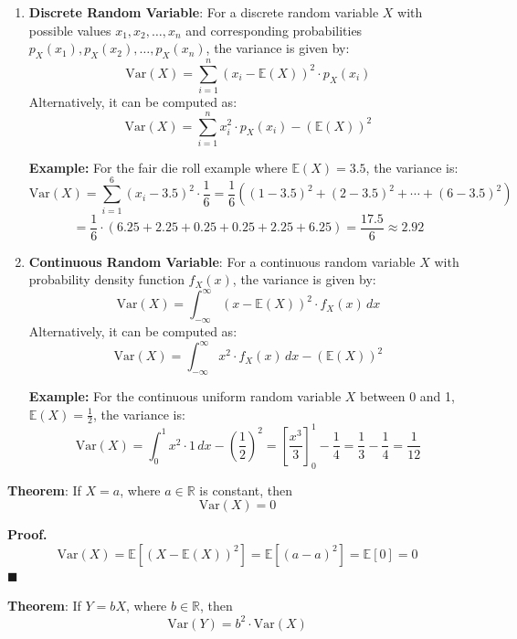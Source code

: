 \documentclass[twoside]{book}
\begin{document}
\begin{enumerate}

\item \textbf{Discrete Random Variable}: For a discrete random variable \( X \) with possible values \( x_1, x_2, \dots, x_n \) and corresponding probabilities \( p_X(x_1), p_X(x_2), \dots, p_X(x_n) \), the variance is given by:
\[
\text{Var}(X) = \sum_{i=1}^{n} (x_i - \mathbb{E}(X))^2 \cdot p_X(x_i)
\]
Alternatively, it can be computed as:
\[
\text{Var}(X) = \sum_{i=1}^{n} x_i^2 \cdot p_X(x_i) - (\mathbb{E}(X))^2
\]

\textbf{Example:} For the fair die roll example where \( \mathbb{E}(X) = 3.5 \), the variance is:
\[
\text{Var}(X) = \sum_{i=1}^{6} (x_i - 3.5)^2 \cdot \frac{1}{6} = \frac{1}{6} \left( (1-3.5)^2 + (2-3.5)^2 + \cdots + (6-3.5)^2 \right)
\]
\[
= \frac{1}{6} \cdot (6.25 + 2.25 + 0.25 + 0.25 + 2.25 + 6.25) = \frac{17.5}{6} \approx 2.92
\]

\item \textbf{Continuous Random Variable}: For a continuous random variable \( X \) with probability density function \( f_X(x) \), the variance is given by:
\[
\text{Var}(X) = \int_{-\infty}^{\infty} (x - \mathbb{E}(X))^2 \cdot f_X(x) \, dx
\]
Alternatively, it can be computed as:
\[
\text{Var}(X) = \int_{-\infty}^{\infty} x^2 \cdot f_X(x) \, dx - (\mathbb{E}(X))^2
\]

\textbf{Example:} For the continuous uniform random variable \( X \) between 0 and 1, $\mathbb{E}(X) = \frac{1}{2}$, the variance is:
\[
\text{Var}(X) = \int_0^1 x^2 \cdot 1 \, dx - \left(\frac{1}{2}\right)^2 = \left[ \frac{x^3}{3} \right]_0^1 - \frac{1}{4} = \frac{1}{3} - \frac{1}{4} = \frac{1}{12}
\]
\end{enumerate}

\begin{textbox}
\textbf{Theorem}: If \( X = a \), where \( a \in \mathbb{R} \) is constant, then  
\[
\mathrm{Var}(X) = 0
\]
\end{textbox}

\textbf{Proof.}  
\[
\mathrm{Var}(X) = \mathbb{E}[(X - \mathbb{E}(X))^2] = \mathbb{E}[(a - a)^2] = \mathbb{E}[0] = 0
\]
\hfill\(\blacksquare\)

\vspace{1em}

\begin{textbox}
\textbf{Theorem}: If \( Y = bX \), where \( b \in \mathbb{R} \), then  
\[
\mathrm{Var}(Y) = b^2 \cdot \mathrm{Var}(X)
\]
\end{textbox}
\end{document}
